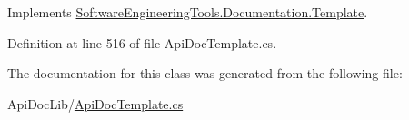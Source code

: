 Implements \hyperlink{class_software_engineering_tools_1_1_documentation_1_1_template_ab13b45a10b7eb65a0b6c15dbc1318664}{Software\+Engineering\+Tools.\+Documentation.\+Template}.



Definition at line 516 of file Api\+Doc\+Template.\+cs.



The documentation for this class was generated from the following file\+:\begin{DoxyCompactItemize}
\item 
Api\+Doc\+Lib/\hyperlink{_api_doc_template_8cs}{Api\+Doc\+Template.\+cs}\end{DoxyCompactItemize}
